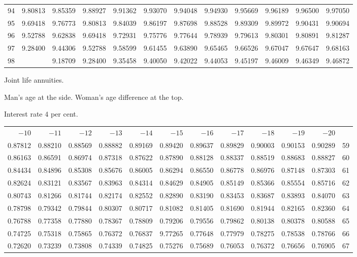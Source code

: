 \begin{center}
\begin{tabular}{|r|rrrrrrrrrrr|}
94&9.80813&9.85359&9.88927&9.91362&9.93070&9.94048&9.94930&9.95669&9.96189&9.96500&9.97050\\[5pt]
95&9.69418&9.76773&9.80813&9.84039&9.86197&9.87698&9.88528&9.89309&9.89972&9.90431&9.90694\\
96&9.52788&9.62838&9.69418&9.72931&9.75776&9.77644&9.78939&9.79613&9.80301&9.80891&9.81287\\
97&9.28400&9.44306&9.52788&9.58599&9.61455&9.63890&9.65465&9.66526&9.67047&9.67647&9.68163\\
98&&9.18709&9.28400&9.35458&9.40050&9.42022&9.44053&9.45197&9.46009&9.46349&9.46872\\
\hline\end{tabular}
\end{center}
\clearpage
{}
\begin{center}
Joint life annuities.\par\smallskip
Man's age at the side. Woman's age difference at the top.\par\smallskip
Interest rate \(4\) per cent.\par\medskip
\fontsize{8}{10}\selectfont\setlength{\tabcolsep}{1.3pt}
\begin{tabular}{|rrrrrrrrrrr|r|}
\hline
\(-10\)&\(-11\)&\(-12\)&\(-13\)&\(-14\)&\(-15\)&\(-16\)&\(-17\)&\(-18\)&\(-19\)&\(-20\)&\\[8pt]
0.87812&0.88210&0.88569&0.88882&0.89169&0.89420&0.89637&0.89829&0.90003&0.90153&0.90289&59\\
0.86163&0.86591&0.86974&0.87318&0.87622&0.87890&0.88128&0.88337&0.88519&0.88683&0.88827&60\\
0.84434&0.84896&0.85308&0.85676&0.86005&0.86294&0.86550&0.86778&0.86976&0.87148&0.87303&61\\
0.82624&0.83121&0.83567&0.83963&0.84314&0.84629&0.84905&0.85149&0.85366&0.85554&0.85716&62\\
0.80743&0.81266&0.81744&0.82174&0.82552&0.82890&0.83190&0.83453&0.83687&0.83893&0.84070&63\\
0.78798&0.79342&0.79844&0.80307&0.80717&0.81082&0.81405&0.81690&0.81944&0.82165&0.82360&64\\[5pt]
0.76788&0.77358&0.77880&0.78367&0.78809&0.79206&0.79556&0.79862&0.80138&0.80378&0.80588&65\\
0.74725&0.75318&0.75865&0.76372&0.76837&9.77265&0.77648&0.77979&0.78275&0.78538&0.78766&66\\
0.72620&0.73239&0.73808&0.74339&0.74825&0.75276&0.75689&0.76053&0.76372&0.76656&0.76905&67\\

\end{tabular}
\end{center}
